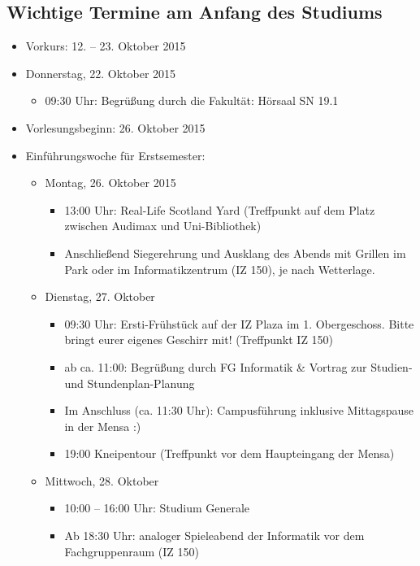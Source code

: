 \subsection{Wichtige Termine am Anfang des Studiums}
\renewcommand{\labelitemi}{$\bullet$}
\renewcommand{\labelitemii}{$\bullet$}
\renewcommand{\labelitemiii}{$\bullet$}
\renewcommand{\labelitemiv}{$\bullet$}

\begin{itemize}
\item Vorkurs: 12. – 23. Oktober 2015
\item Donnerstag, 22. Oktober 2015
\begin{itemize}
\item 09:30 Uhr: Begrüßung durch die Fakultät: Hörsaal SN 19.1
\end{itemize}
\item Vorlesungsbeginn: 26. Oktober 2015
\item Einführungswoche für Erstsemester:
\begin{itemize}
\item Montag, 26. Oktober 2015
\begin{itemize}
\item 13:00 Uhr: Real-Life Scotland Yard (Treffpunkt auf dem Platz zwischen Audimax und Uni-Bibliothek)
\item Anschließend Siegerehrung und Ausklang des Abends mit Grillen im Park oder im Informatikzentrum (IZ 150), je nach Wetterlage.
\end{itemize}
\item Dienstag, 27. Oktober
\begin{itemize}
\item 09:30 Uhr: Ersti-Frühstück auf der IZ Plaza im 1. Obergeschoss. Bitte bringt eurer eigenes Geschirr mit! (Treffpunkt IZ 150)
\item ab ca. 11:00: Begrüßung durch FG Informatik \& Vortrag zur Studien- und Stundenplan-Planung
\item Im Anschluss (ca. 11:30 Uhr): Campusführung inklusive Mittagspause in der Mensa :)
\item 19:00 Kneipentour (Treffpunkt vor dem Haupteingang der Mensa)
\end{itemize}
\item Mittwoch, 28. Oktober
\begin{itemize}
\item 10:00 – 16:00 Uhr: Studium Generale
\item Ab 18:30 Uhr: analoger Spieleabend der Informatik vor dem Fachgruppenraum (IZ 150)

\end{itemize}
\end{itemize}
\end{itemize}

